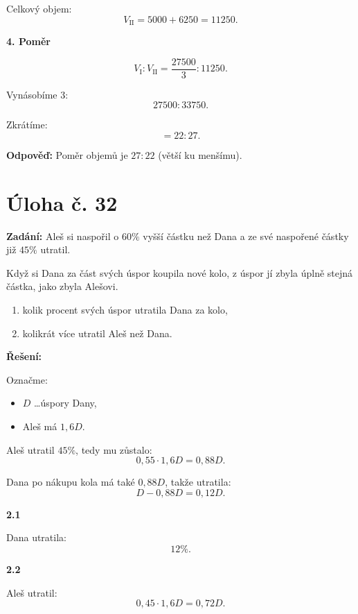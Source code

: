 \documentclass[12pt,a4paper]{article}
\begin{document}
Celkový objem:
\[
V_{\text{II}}=5000+6250=11250.
\]

\medskip

\textbf{4. Poměr}

\[
V_{\text{I}}:V_{\text{II}}=\frac{27500}{3}:11250.
\]

Vynásobíme 3:
\[
27500:33750.
\]

Zkrátíme:
\[
=22:27.
\]

\bigskip

\textbf{Odpověď:}  
Poměr objemů je \(27:22\) (větší ku menšímu).




\newpage
\section*{Úloha č. 32}

\textbf{Zadání:}  
Aleš si naspořil o \(60\%\) vyšší částku než Dana a ze své naspořené částky již \(45\%\) utratil.

Když si Dana za část svých úspor koupila nové kolo, z úspor jí zbyla úplně stejná částka, jako zbyla Alešovi.

\begin{enumerate}
    \item[2.1] kolik procent svých úspor utratila Dana za kolo,
    \item[2.2] kolikrát více utratil Aleš než Dana.
\end{enumerate}

\bigskip

\textbf{Řešení:}

Označme:
\begin{itemize}
    \item \(D\) \dots úspory Dany,
    \item Aleš má \(1{,}6D\).
\end{itemize}

Aleš utratil \(45\%\), tedy mu zůstalo:
\[
0{,}55 \cdot 1{,}6D = 0{,}88D.
\]

Dana po nákupu kola má také \(0{,}88D\), takže utratila:
\[
D - 0{,}88D = 0{,}12D.
\]

\medskip

\textbf{2.1}

Dana utratila:
\[
12\%.
\]

\medskip

\textbf{2.2}

Aleš utratil:
\[
0{,}45 \cdot 1{,}6D = 0{,}72D.
\]
\end{document}
